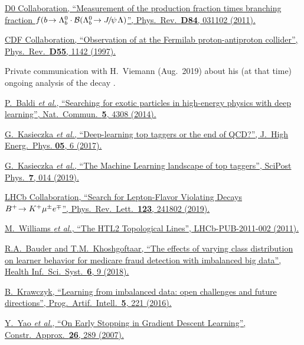 {\begin{thebibliography}{xxx}
	\href{https://doi.org/10.1103/PhysRevD.84.031102}{D0 Collaboration, \enquote{Measurement of the production fraction times branching fraction $f({b}\!\rightarrow {\ensuremath{{\Lambda}^0_{b}}} \cdot {\ensuremath{\mathcal{B}}}({{\Lambda}^0_{b}}\!\rightarrow {\ensuremath{{J\mskip -3mu/\mskip -2mu\psi\mskip 2mu}}}{\ensuremath{\Lambda}})$}, Phys.\ Rev.\ \textbf{D84}, 031102 (2011).}

	\href{https://doi.org/10.1103/PhysRevD.55.1142}{CDF Collaboration, \enquote{Observation of \decay{\Lb}{\jpsi\Lz} at the Fermilab proton-antiproton collider}, Phys.\ Rev.\ \textbf{D55}, 1142 (1997).}

	Private communication with H.~Viemann (Aug.~2019) about his (at that time) ongoing analysis of the decay \decay{\Lb}{\Dz\proton\Km}.

	\href{https://doi.org/10.1038/ncomms5308}{P.~Baldi \textit{et al.}, \enquote{Searching for exotic particles in high-energy physics with deep learning}, Nat.\ Commun.\ \textbf{5}, 4308 (2014).}

	\href{https://doi.org/10.1007/JHEP05(2017)006}{G.~Kasieczka \textit{et al.}, \enquote{Deep-learning top taggers or the end of QCD?}, J.\ High Energ.\ Phys. \textbf{05}, 6 (2017).}

	\href{https://doi.org/10.21468/SciPostPhys.7.1.014}{G.~Kasieczka \textit{et al.}, \enquote{The Machine Learning landscape of top taggers}, SciPost Phys.\ \textbf{7}, 014 (2019).}

	\href{https://doi.org/10.1103/PhysRevLett.123.241802}{LHCb Collaboration, \enquote{Search for Lepton-Flavor Violating Decays ${{B}^+}\!\rightarrow {\ensuremath{{K}^+}}{\ensuremath{\mu}}^\pm{\ensuremath{e}}^\mp$}, Phys.\ Rev.\ Lett.\ \textbf{123}, 241802 (2019).}

	\href{http://inspirehep.net/record/928798}{M.~Williams \textit{et al.}, \enquote{The HTL2 Topological Lines}, LHCb-PUB-2011-002 (2011).}

	\href{https://doi.org/10.1007/s13755-018-0051-3}{R.A.~Bauder and T.M.~Khoshgoftaar, \enquote{The effects of varying class distribution on learner behavior for medicare fraud detection with imbalanced big data}, Health Inf.\ Sci.\ Syst.~\textbf{6}, 9 (2018).}

	\href{https://doi.org/10.1007/s13748-016-0094-0}{B.~Krawczyk, \enquote{Learning from imbalanced data: open challenges and future directions}, Prog.\ Artif.\ Intell.\ \textbf{5}, 221 (2016).}

	\href{https://doi.org/10.1007/s00365-006-0663-2}{Y.~Yao \textit{et al.}, \enquote{On Early Stopping in Gradient Descent Learning}, Constr.\ Approx.\ \textbf{26}, 289 (2007).}


\end{thebibliography}}

